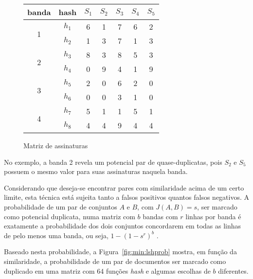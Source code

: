 \begin{figure}[!htbp]
\centering
\begin{tabular}{ c | c || c | c | c | c | c }
 banda & hash & $S_1$ & $S_2$ & $S_3$ & $S_4$ & $S_5$ \\
\hline
  \multirow{2}{*}{1} & $h_1$ & 6   & 1   & 7   & 6  & 2   \\
                     & $h_2$ & 1   & 3   & 7   & 1  & 3   \\
\hline
  \multirow{2}{*}{2} & $h_3$ & 8   & 3   & 8   & 5  & 3   \\
                     & $h_4$ & 0   & 9   & 4   & 1  & 9   \\
\hline
  \multirow{2}{*}{3} & $h_5$ & 2   & 0   & 6   & 2  & 0   \\
                       & $h_6$ & 0   & 0   & 3   & 1  & 0   \\
\hline
  \multirow{2}{*}{4} & $h_7$ & 5   & 1   & 1   & 5  & 1   \\
                     & $h_8$ & 4   & 4   & 9   & 4  & 4   \\
\end{tabular}
\caption{Matriz de assinaturas}
\label{fig:minhash_signaturematrix}
\end{figure}

No exemplo, a banda 2 revela um potencial par de quase-duplicatas, pois $S_2$ e $S_5$ possuem o mesmo valor para suas assinaturas naquela banda.

Considerando que deseja-se encontrar pares com similaridade acima de um certo limite, esta técnica está sujeita tanto a falsos positivos quantos falsos negativos. A probabilidade de um par de conjuntos $A$ e $B$, com $J(A, B) = s$, ser marcado como potencial duplicata, numa matriz com $b$ bandas com $r$ linhas por banda é exatamente a probabilidade dos dois conjuntos concordarem em todas as linhas de pelo menos uma banda, ou seja, $1 - (1 - s^r)^b$  \cite{rajaraman2012mining}.

Baseado nesta probabilidade, a Figura~\ref{fig:min:lshprob} mostra, em função da similaridade, a probabilidade de um par de documentos ser marcado como duplicado em uma matriz com 64 funções \emph{hash} e algumas escolhas de $b$ diferentes.

